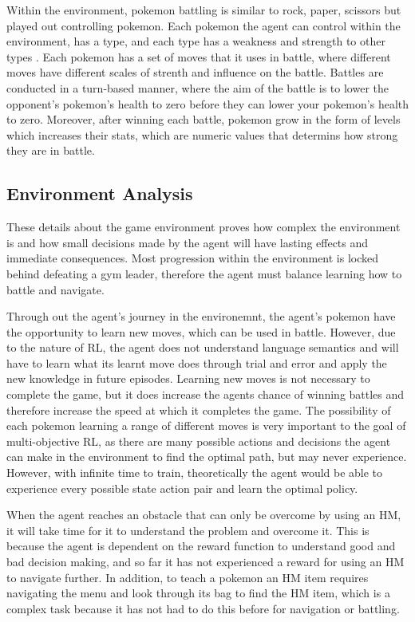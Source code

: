 Within the environment, pokemon battling is similar to rock, paper, scissors but played out controlling pokemon. Each pokemon the agent can control within the environment, has a type, and each type has a weakness and strength to other types \cite{SerebiiTeam2016}. Each pokemon has a set of moves that it uses in battle, where different moves have different scales of strenth and influence on the battle. Battles are conducted in a turn-based manner, where the aim of the battle is to lower the opponent's pokemon's health to zero before they can lower your pokemon's health to zero. Moreover, after winning each battle, pokemon grow in the form of levels which increases their stats, which are numeric values that determins how strong they are in battle. 


\subsection{Environment Analysis}

These details about the game environment proves how complex the environment is and how small decisions made by the agent will have lasting effects and immediate consequences. Most progression within the environment is locked behind defeating a gym leader, therefore the agent must balance learning how to battle and navigate. 

Through out the agent's journey in the environemnt, the agent's pokemon have the opportunity to learn new moves, which can be used in battle. However, due to the nature of RL, the agent does not understand language semantics and will have to learn what its learnt move does through trial and error and apply the new knowledge in future episodes. Learning new moves is not necessary to complete the game, but it does increase the agents chance of winning battles and therefore increase the speed at which it completes the game. The possibility of each pokemon learning a range of different moves is very important to the goal of multi-objective RL, as there are many possible actions and decisions the agent can make in the environment to find the optimal path, but may never experience. However, with infinite time to train, theoretically the agent would be able to experience every possible state action pair and learn the optimal policy. 

When the agent reaches an obstacle that can only be overcome by using an HM, it will take time for it to understand the problem and overcome it. This is because the agent is dependent on the reward function to understand good and bad decision making, and so far it has not experienced a reward for using an HM to navigate further. In addition, to teach a pokemon an HM item requires navigating the menu and look through its bag to find the HM item, which is a complex task because it has not had to do this before for navigation or battling.


